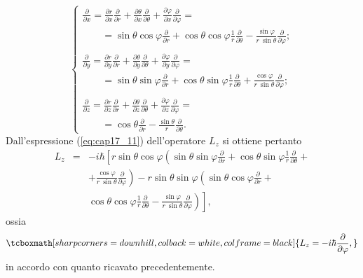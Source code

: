 \documentclass[a4paper,12pt,oneside]{book}
\begin{document}
\begin{equation}
\begin{cases}
\displaystyle{\frac{\partial}{\partial x} = \frac{\partial r}{\partial x}\frac{\partial}{\partial r}+\frac{\partial \theta}{\partial x}\frac{\partial}{\partial \theta}+ \frac{\partial \varphi}{\partial x}\frac{\partial}{\partial \varphi} = }\\
\qquad = \displaystyle{\sin\theta \cos \varphi \frac{\partial}{\partial r}+\cos\theta \cos \varphi\frac{1}{r} \frac{\partial}{\partial \theta}-\frac{\sin \varphi}{r\ \sin \theta} \frac{\partial}{\partial \varphi}}; \\
\\
\displaystyle{\frac{\partial}{\partial y} = \frac{\partial r}{\partial y}\frac{\partial}{\partial r}+\frac{\partial \theta}{\partial y}\frac{\partial}{\partial \theta}+ \frac{\partial \varphi}{\partial y}\frac{\partial}{\partial \varphi} = }\\
\qquad = \displaystyle{\sin\theta \sin \varphi \frac{\partial}{\partial r}+\cos\theta \sin \varphi\frac{1}{r} \frac{\partial}{\partial \theta}+\frac{\cos \varphi}{r\ \sin \theta} \frac{\partial}{\partial \varphi}}; \\
\\
\displaystyle{\frac{\partial}{\partial z} = \frac{\partial r}{\partial z}\frac{\partial}{\partial r}+\frac{\partial \theta}{\partial z}\frac{\partial}{\partial \theta}+ \frac{\partial \varphi}{\partial z}\frac{\partial}{\partial \varphi} = }\\
\qquad = \displaystyle{\cos\theta\frac{\partial}{\partial r}-\frac{\sin \theta}{r} \frac{\partial}{\partial \theta}}.
\end{cases}
\end{equation}
Dall'espressione (\ref{eq:cap17_11}) dell'operatore $L_z$ si ottiene pertanto
\begin{eqnarray}
L_z &=&-i\hbar \left[ r\sin \theta \cos \varphi \left(\sin \theta \sin \varphi \frac{\partial}{\partial r}+\cos \theta \sin \varphi\frac{1}{r} \frac{\partial}{\partial \theta}+ \right.\right. \nonumber \\
& &\left. + \frac{\cos \varphi}{r\ \sin \theta} \frac{\partial}{\partial \varphi}\right) - r \sin \theta \sin \varphi \left( \sin \theta \cos \varphi \frac{\partial}{\partial r}+\right. \nonumber \\
& & \left. \left. \cos \theta \cos \varphi\frac{1}{r} \frac{\partial}{\partial \theta}-\frac{\sin \varphi}{r\ \sin \theta} \frac{\partial}{\partial \varphi}\right)\right] ,
\end{eqnarray}
ossia
	\begin{equation}
		\tcboxmath[sharp corners=downhill, colback=white, colframe=black]{
		L_z = -i\hbar \frac{\partial}{\partial \varphi},
		}
	\end{equation}
in accordo con quanto ricavato precedentemente.\\
\end{document}
